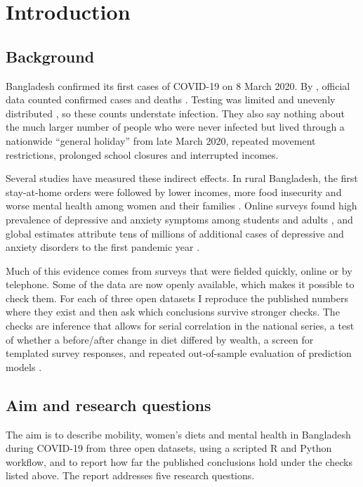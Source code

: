 \chapter{Introduction}\label{ch:intro}

\section{Background}
Bangladesh confirmed its first cases of COVID-19 on 8 March 2020. By \NatEndDate{}, official data counted \NatTotalCases{} confirmed cases and \NatTotalDeaths{} deaths \parencite{owid2024}. Testing was limited and unevenly distributed \parencite{hasell2020}, so these counts understate infection. They also say nothing about the much larger number of people who were never infected but lived through a nationwide ``general holiday'' from late March 2020, repeated movement restrictions, prolonged school closures and interrupted incomes.

Several studies have measured these indirect effects. In rural Bangladesh, the first stay-at-home orders were followed by lower incomes, more food insecurity and worse mental health among women and their families \parencite{hamadani2020}. Online surveys found high prevalence of depressive and anxiety symptoms among students and adults \parencite{islam2020,banna2022,islam2023}, and global estimates attribute tens of millions of additional cases of depressive and anxiety disorders to the first pandemic year \parencite{santomauro2021}.

Much of this evidence comes from surveys that were fielded quickly, online or by telephone. Some of the data are now openly available, which makes it possible to check them. For each of three open datasets I reproduce the published numbers where they exist and then ask which conclusions survive stronger checks. The checks are inference that allows for serial correlation in the national series, a test of whether a before/after change in diet differed by wealth, a screen for templated survey responses, and repeated out-of-sample evaluation of prediction models \parencite{collins2015}.

\section{Aim and research questions}
The aim is to describe mobility, women's diets and mental health in Bangladesh during COVID-19 from three open datasets, using a scripted R and Python workflow, and to report how far the published conclusions hold under the checks listed above. The report addresses five research questions.

